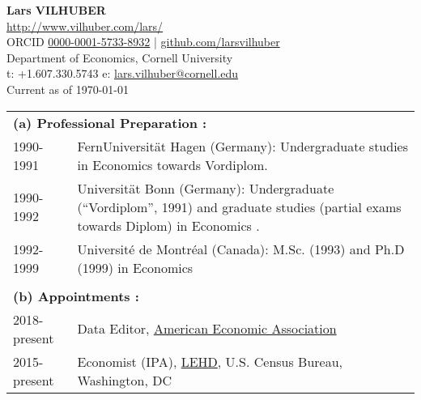 \documentclass[10pt,letterpaper]{article}
\newcommand{\myversion}{\today}
\begin{document}
\thispagestyle{empty}
\begin{center}
{\bf {Lars VILHUBER}}\\
\url{http://www.vilhuber.com/lars/}\\
ORCID \href{https://orcid.org/0000-0001-5733-8932}{0000-0001-5733-8932} | 
\href{https://github.com/larsvilhuber}{github.com/larsvilhuber}\\
Department of Economics, Cornell University\\
t: +1.607.330.5743 e: \href{mailto:lars.vilhuber@cornell.edu}{lars.vilhuber@cornell.edu}\\
Current as of \today
\end{center}

\begin{longtable}{p{1in}p{5.3in}}
\multicolumn{2}{l}{\bf (a) Professional Preparation :}\\
1990-1991   &    FernUniversität Hagen (Germany): Undergraduate studies in Economics towards Vordiplom. \\
1990-1992   &    Universität Bonn (Germany): Undergraduate (``Vordiplom'', 1991) and graduate studies (partial exams towards Diplom) in Economics .     \\
1992-1999   &    Université de Montréal (Canada): M.Sc. (1993) and Ph.D (1999) in Economics \\
\\
\multicolumn{2}{l}{\bf (b) Appointments :}\ \\
%
2018-present & Data Editor, \href{https://www.aeaweb.org}{American Economic Association}
\\%
2015-present & Economist (IPA), 
\href{http://lehd.ces.census.gov}{LEHD}, U.S. Census Bureau, Washington,
DC %
\\%

\end{longtable}
\end{document}
